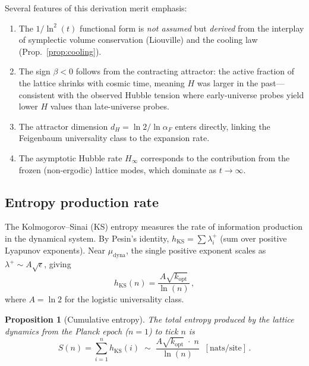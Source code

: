 \documentclass[twocolumn,showpacs,preprintnumbers,amsmath,amssymb,prd]{revtex4-2}
\newtheorem{proposition}{Proposition}
\newcommand{\lnq}{\ln^2}
\newcommand{\Hinf}{H_{\infty}}
\begin{document}
Several features of this derivation merit emphasis:
\begin{enumerate}
  \item The $1/\lnq(t)$ functional form is \emph{not assumed}
    but \emph{derived} from the interplay of symplectic volume
    conservation (Liouville) and the cooling law (Prop.~\ref{prop:cooling}).
  \item The sign $\beta < 0$ follows from the contracting attractor:
    the active fraction of the lattice shrinks with cosmic time,
    meaning $H$ was larger in the past---consistent with the
    observed Hubble tension where early-universe probes yield
    lower $H$ values than late-universe probes.
  \item The attractor dimension $d_H = \ln 2/\ln\alpha_F$ enters
    directly, linking the Feigenbaum universality class to the
    expansion rate.
  \item The asymptotic Hubble rate $\Hinf$ corresponds to the
    contribution from the frozen (non-ergodic) lattice modes,
    which dominate as $t \to \infty$.
\end{enumerate}

\subsection{Entropy production rate}\label{sec:entropy}

The Kolmogorov--Sinai (KS) entropy measures the rate of
information production in the dynamical system.
By Pesin's identity, $h_{\mathrm{KS}} = \sum \lambda_i^+$
(sum over positive Lyapunov exponents).
Near $\mu_{\mathrm{dyna}}$, the single positive exponent scales as
$\lambda^+ \sim A\sqrt{\epsilon}$, giving
\begin{equation}
  h_{\mathrm{KS}}(n) = \frac{A\sqrt{k_{\mathrm{opt}}}}{\ln(n)}\,,
  \label{eq:hKS}
\end{equation}
where $A = \ln 2$ for the logistic universality class.

\begin{proposition}[Cumulative entropy]\label{prop:entropy}
The total entropy produced by the lattice dynamics from the
Planck epoch ($n=1$) to tick $n$ is
\begin{equation}
  S(n) = \sum_{i=1}^{n} h_{\mathrm{KS}}(i)
  \;\sim\; \frac{A\sqrt{k_{\mathrm{opt}}}\;\cdot\; n}{\ln(n)}
  \;\;\mathrm{[nats/site]}\,.
  \label{eq:Stotal}
\end{equation}
\end{proposition}
\end{document}
